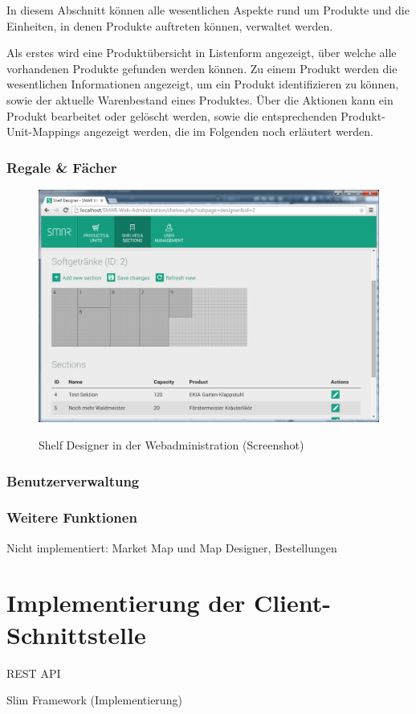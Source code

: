In diesem Abschnitt können alle wesentlichen Aspekte rund um Produkte und die Einheiten, in denen Produkte auftreten können, verwaltet werden.

Als erstes wird eine Produktübersicht in Listenform angezeigt, über welche alle vorhandenen Produkte gefunden werden können. Zu einem Produkt werden die wesentlichen Informationen angezeigt, um ein Produkt identifizieren zu können, sowie der aktuelle Warenbestand eines Produktes. Über die Aktionen kann ein Produkt bearbeitet oder gelöscht werden, sowie die entsprechenden Produkt-Unit-Mappings angezeigt werden, die im Folgenden noch erläutert werden.



\subsection{Regale \& Fächer}

\begin{figure}[H]
	\centering
	{\includegraphics[width=\textwidth]{Bilder/Abbildungen/webadmin_shelves_designer.png}}
	\caption{Shelf Designer in der Webadministration (Screenshot)}
	\label{fig:webadmin_shelves_designer}
\end{figure}


\subsection{Benutzerverwaltung}


\subsection{Weitere Funktionen}
Nicht implementiert: Market Map und Map Designer, Bestellungen

\chapter{Implementierung der Client-Schnittstelle}

REST API

Slim Framework (Implementierung)



